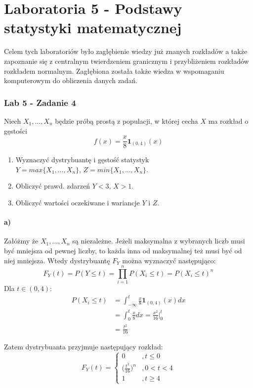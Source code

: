 \documentclass{article}
\begin{document}
{%
\newpage
\part{Laboratoria 5 - Podstawy statystyki matematycznej}
Celem tych laboratoriów było zagłębienie wiedzy już znanych rozkładów a także zapoznanie się z centralnym twierdzeniem granicznym i przybliżeniem rozkładów rozkładem normalnym. Zagłębiona została także wiedza w wspomaganiu komputerowym do obliczenia danych zadań.

\section{Lab 5 - Zadanie 4}
Niech $X_1, \dots , X_n$ będzie próbą prostą z populacji, w której
cecha $X$ ma rozkład o gęstości
\[
f(x) = \frac{x}{8} \textbf{1}_{(0,4)}(x)
\]
\begin{enumerate}[label = \alph*)]
\item Wyznaczyć dystrybuantę i gęstość statystyk\\ $Y = max\{X_1,\dots, X_n\}$, $Z = min\{ X_1,\dots ,X_n \}$.
\item Obliczyć prawd. zdarzeń $Y<3$, $X>1$.
\item Obliczyć wartości oczekiwane i wariancje $Y$ i $Z$.
\end{enumerate}

\subsection{a)}
Załóżmy że $X_1,\dots,X_n$ są niezależne. Jeżeli maksymalna z wybranych liczb musi być mniejsza od pewnej liczby, to każda inna od maksymalnej też musi być od niej mniejsza. Wtedy dystrybuantę $F_Y$ można wyznaczyć następująco:
\[
F_Y(t) = P(Y\leq t) = \prod_{i=1}^{n} P(X_i \leq t) = P(X_i \leq t)^n
\]
Dla $t \in (0,4)$:
\begin{align*}
P(X_i \leq t) & = \int_{-\infty}^{t} \frac{x}{8} \textbf{1}_{(0,4)}(x) dx \\
& = \int_{0}^{t} \frac{x}{8} dx = \frac{x^2}{16} \Big\vert_{0}^{t} \\
& = \frac{t^2}{16}
\end{align*}

Zatem dystrybuanta przyjmuje następujący rozkład:
\[
F_Y(t) = \left\{
\begin{array}{ll}
0 &, t \leq 0 \\
\Big( \frac{t^2}{16} \Big)^n &, 0<t<4 \\
1 &, t \geq 4
\end{array}
\right.
\]

}
\end{document}
